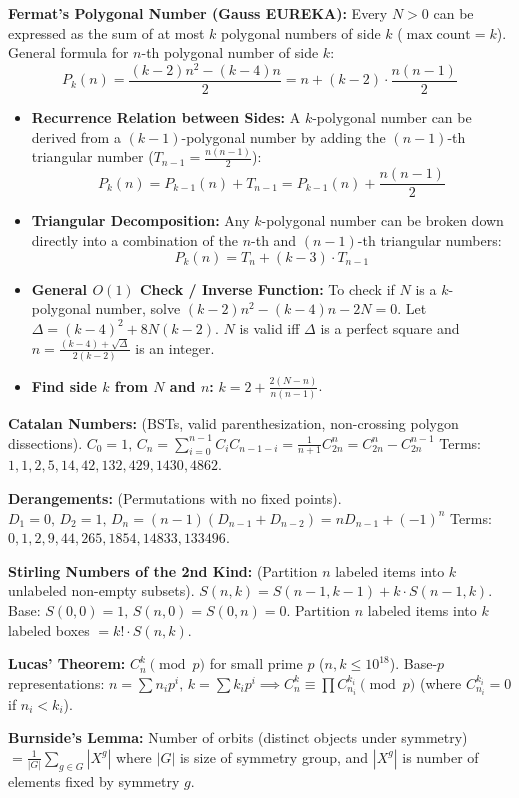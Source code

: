 \textbf{Fermat's Polygonal Number (Gauss EUREKA):}
Every $N > 0$ can be expressed as the sum of at most $k$ polygonal numbers of side $k$ ($\max \text{count} = k$).
General formula for $n$-th polygonal number of side $k$: 
$$P_k(n) = \frac{(k - 2)n^2 - (k - 4)n}{2} = n + (k - 2) \cdot \frac{n(n-1)}{2}$$
\begin{itemize}
    \item \textbf{Recurrence Relation between Sides:} A $k$-polygonal number can be derived from a $(k-1)$-polygonal number by adding the $(n-1)$-th triangular number ($T_{n-1} = \frac{n(n-1)}{2}$):
    $$P_k(n) = P_{k-1}(n) + T_{n-1} = P_{k-1}(n) + \frac{n(n-1)}{2}$$
    \item \textbf{Triangular Decomposition:} Any $k$-polygonal number can be broken down directly into a combination of the $n$-th and $(n-1)$-th triangular numbers:
    $$P_k(n) = T_n + (k - 3) \cdot T_{n-1}$$
    \item \textbf{General $O(1)$ Check / Inverse Function:} To check if $N$ is a $k$-polygonal number, solve $(k - 2)n^2 - (k - 4)n - 2N = 0$. Let $\Delta = (k - 4)^2 + 8N(k - 2)$. $N$ is valid iff $\Delta$ is a perfect square and $n = \frac{(k - 4) + \sqrt{\Delta}}{2(k - 2)}$ is an integer.
    \item \textbf{Find side $k$ from $N$ and $n$:} $k = 2 + \frac{2(N - n)}{n(n - 1)}$.
\end{itemize}

\textbf{Catalan Numbers:} (BSTs, valid parenthesization, non-crossing polygon dissections).
$C_0 = 1, \, C_n = \sum_{i=0}^{n-1} C_i C_{n-1-i} = \frac{1}{n+1} C_{2n}^n = C_{2n}^n - C_{2n}^{n-1}$
Terms: $1, 1, 2, 5, 14, 42, 132, 429, 1430, 4862$.

\textbf{Derangements:} (Permutations with no fixed points).
$D_1 = 0, \, D_2 = 1, \, D_n = (n-1)(D_{n-1} + D_{n-2}) = n D_{n-1} + (-1)^n$
Terms: $0, 1, 2, 9, 44, 265, 1854, 14833, 133496$.

\textbf{Stirling Numbers of the 2nd Kind:} (Partition $n$ labeled items into $k$ unlabeled non-empty subsets).
$S(n, k) = S(n-1, k-1) + k \cdot S(n-1, k)$. Base: $S(0, 0) = 1, \, S(n, 0) = S(0, n) = 0$.
Partition $n$ labeled items into $k$ labeled boxes $= k! \cdot S(n, k)$.

\textbf{Lucas' Theorem:} $C_n^k \pmod p$ for small prime $p$ ($n, k \le 10^{18}$). Base-$p$ representations:
$n = \sum n_i p^i, \, k = \sum k_i p^i \implies C_n^k \equiv \prod C_{n_i}^{k_i} \pmod p$ (where $C_{n_i}^{k_i} = 0$ if $n_i < k_i$).

\textbf{Burnside's Lemma:} Number of orbits (distinct objects under symmetry) $= \frac{1}{|G|} \sum_{g \in G} |X^g|$ where $|G|$ is size of symmetry group, and $|X^g|$ is number of elements fixed by symmetry $g$.

